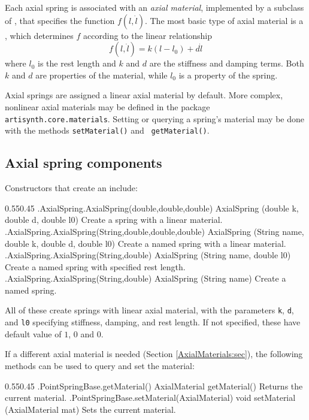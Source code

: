 Each axial spring is associated with an {\it axial material},
implemented by a subclass of
, that specifies
the function $f(l, \dot l)$. The most basic type of axial material is
a , which
determines $f$ according to the linear relationship
%
\begin{equation}
f(l, \dot l) = k (l-l_0) + d \dot l
\end{equation}
%
where $l_0$ is the rest length and $k$ and $d$ are the stiffness and
damping terms. Both $k$ and $d$ are properties of the material, while
$l_0$ is a property of the spring.

Axial springs are assigned a linear axial material by default.  More
complex, nonlinear axial materials may be defined in the package {\tt
artisynth.core.materials}. Setting or querying a spring's material
may be done with the methods {\tt setMaterial()} and {\tt
getMaterial()}.

\subsection{Axial spring components}

Constructors that create an  include:
%
\begin{methodtable}{0.55}{0.45}
\midline
% 
\methodentry
{\mech.AxialSpring.AxialSpring(double,double,double)}%
{AxialSpring (double k, double d, double l0)}%
{Create a spring with a linear material.}%
%
\methodentry
{\mech.AxialSpring.AxialSpring(String,double,double,double)}%
{AxialSpring (String name, double k, double d, double l0)}%
{Create a named spring with a linear material.}%
%
\methodentry
{\mech.AxialSpring.AxialSpring(String,double)}%
{AxialSpring (String name, double l0)}%
{Create a named spring with specified rest length.}%
%
\methodentry
{\mech.AxialSpring.AxialSpring(String,double)}%
{AxialSpring (String name)}%
{Create a named spring.}%
%
\midline
\end{methodtable}
%
All of these create springs with linear axial material, with the parameters
{\tt k}, {\tt d}, and {\tt l0} specifying stiffness, damping, and rest
length. If not specified, these have default value of $1$, $0$ and $0$.

If a different axial material is needed (Section \ref{AxialMaterials:sec}), the
following methods can be used to query and set the material:
%
\begin{methodtable}{0.55}{0.45}
\midline
% 
\methodentry
{\mech.PointSpringBase.getMaterial()}%
{AxialMaterial getMaterial()}%
{Returns the current material.}%
%
\methodentry
{\mech.PointSpringBase.setMaterial(AxialMaterial)}%
{void setMaterial (AxialMaterial mat)}%
{Sets the current material.}%
%
\midline
\end{methodtable}
%


